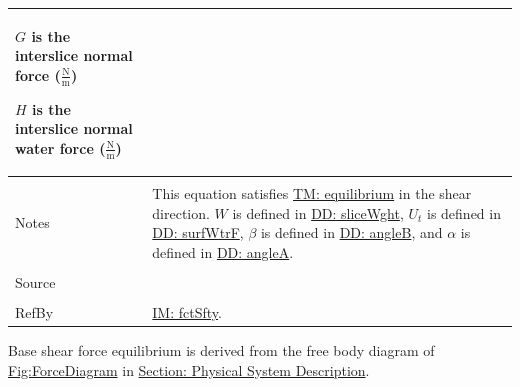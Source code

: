 \documentclass[12pt]{article}
\begin{document}
\begin{minipage}{\textwidth}
\begin{tabular}{p{} p{}}
\begin{symbDescription}
                                         \item{$G$ is the interslice normal force ($\frac{\text{N}}{\text{m}}$)}
                                         \item{$H$ is the interslice normal water force  ($\frac{\text{N}}{\text{m}}$)}
                                         \end{symbDescription}
                                         \\ \midrule \\
                                         Notes & This equation satisfies \hyperref[TM:equilibrium]{TM: equilibrium} in the shear direction. $W$ is defined in \hyperref[DD:sliceWght]{DD: sliceWght}, ${U_{t}}$ is defined in \hyperref[DD:surfWtrF]{DD: surfWtrF}, $β$ is defined in \hyperref[DD:angleB]{DD: angleB}, and $α$ is defined in \hyperref[DD:angleA]{DD: angleA}.
                                                 \\ \midrule \\
                                                 Source & \cite{chen2005}
                                                          \\ \midrule \\
                                                          RefBy & \hyperref[IM:fctSfty]{IM: fctSfty}.
\\ \bottomrule \end{tabular}
\end{minipage}
Base shear force equilibrium is derived from the free body diagram of \hyperref[Figure:ForceDiagram]{Fig:ForceDiagram} in \hyperref[Sec:PhysSyst]{Section: Physical System Description}.
\par~
\end{document}
